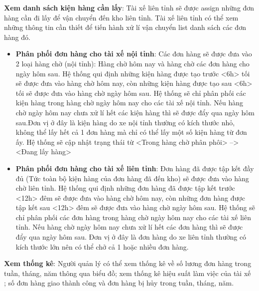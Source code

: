 \begin{itemize}
	\textbf{Xem danh sách kiện hàng cần lấy}: Tài xế liên tỉnh sẽ được assign những đơn hàng cần đi lấy để vận chuyển đến kho liên tỉnh. Tài xế liên tỉnh có thể xem những thông tin cần thiết để tiến hành xử lí vận chuyển list danh sách các đơn hàng đó.
	\begin{itemize}
		\item \textbf{Phân phối đơn hàng cho tài xế nội tỉnh}: Các đơn hàng sẽ được đưa vào 2 loại hàng chờ (nội tỉnh): Hàng chờ hôm nay và hàng chờ các đơn hàng cho ngày hôm sau. Hệ thống qui định những kiện hàng được tạo trước <6h> tối sẽ được đưa vào hàng chờ hôm nay, còn những kiện hàng được tạo sau <6h> tối sẽ được đưa vào hàng chờ ngày hôm sau. Hệ thống sẽ chỉ phân phối các kiện hàng trong hàng chờ ngày hôm nay cho các tài xế nội tỉnh. Nếu hàng chờ ngày hôm nay chưa xử lí hết các kiện hàng thì sẽ được đẩy qua ngày hôm sau.Đơn vị ở đây là kiện hàng do xe nội tỉnh thường có kích thước nhỏ, không thể lấy hết cả 1 đơn hàng mà chỉ có thể lấy một số kiện hàng từ đơn ấy. Hệ thống sẽ cập nhật trạng thái từ <Trong hàng chờ phân phôi>  -->  <Đang lấy hàng>
		\item \textbf{Phân phối đơn hàng cho tài xế liên tỉnh}: Đơn hàng đã được tập kết đầy đủ (Tức toàn bộ kiện hàng của đơn hàng đã đến kho) sẽ được đưa vào hàng chờ liên tỉnh. Hệ thống qui định những đơn hàng đã được tập kết trước <12h> đêm sẽ được đưa vào hàng chờ hôm nay, còn những đơn hàng được tập kết sau <12h> đêm sẽ được đưa vào hàng chờ ngày hôm sau. Hệ thống sẽ chỉ phân phối các đơn hàng trong hàng chờ ngày hôm nay cho các tài xế liên tỉnh. Nếu hàng chờ ngày hôm nay chưa xử lí hết các đơn hàng thì sẽ được đẩy qua ngày hôm sau. Đơn vị ở đây là đơn hàng do xe liên tỉnh thường có kích thước lớn nên có thể chở cả 1 hoặc nhiều đơn hàng.
	\end{itemize}
	
	
	\textbf{Xem thống kê}: Người quản lý có thể  xem thống kê về số lương đơn hàng trong tuần, tháng, năm thông qua biểu đồ; xem thống kê hiệu suất làm việc của tài xế ; số đơn hàng giao thành công và đơn hàng bị hủy trong tuần, tháng, năm.
	

\end{itemize}
